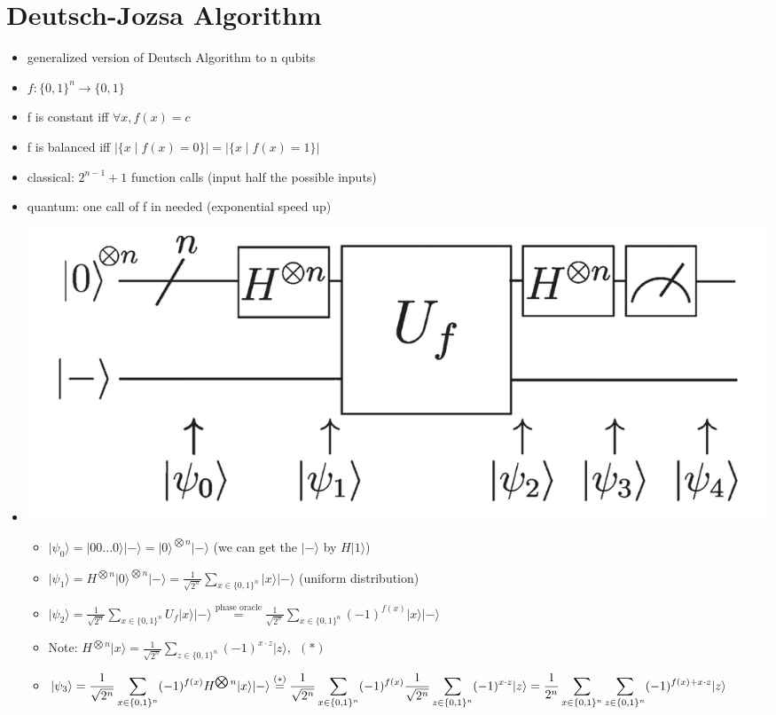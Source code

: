 \documentclass[12pt,a4paper]{article}
\newcommand{\ecb}[1]{\{#1\}}
\newcommand{\ket}[1]{\vert #1 \rangle}
\begin{document}
\section{Deutsch-Jozsa Algorithm}
\begin{itemize}
\item generalized version of Deutsch Algorithm to n qubits
\item $f : \ecb{0,1}^n \rightarrow \ecb{0,1}$
\item f is constant iff $\forall x, f(x) = c$
\item f is balanced iff $|\ecb{x \mid f(x) = 0}| = |\ecb{x \mid f(x) = 1}|$
\item classical: $2^{n-1}+1$ function calls (input half the possible inputs)
\item quantum: one call of f in needed (exponential speed up)
\item \includegraphics[scale=0.3]{./resources/jozsaplan.png}
\begin{itemize}
\item $\ket{\psi_0} = \ket{00...0}\ket{-} = \ket{0}^{\bigotimes n}\ket{-}$ (we can get the $\ket{-}$ by $H\ket{1}$)
\item $\displaystyle \ket{\psi_1} = H^{\bigotimes n}\ket{0}^{\bigotimes n}\ket{-} = \frac{1}{\sqrt{2^n}} \sum_{x\in\ecb{0,1}^n} \ket{x}\ket{-}$ (uniform distribution)
\item $\displaystyle \ket{\psi_2} = \frac{1}{\sqrt{2^n}} \sum_{x\in\ecb{0,1}^n}U_f\ket{x}\ket{-} \overset{\text{phase oracle}}{=} \frac{1}{\sqrt{2^n}} \sum_{x\in\ecb{0,1}^n} (-1)^{f(x)}\ket{x}\ket{-}$
\item Note: $\displaystyle H^{\bigotimes n}\ket{x} = \frac{1}{\sqrt{2^n}} \sum_{z\in\ecb{0,1}^n} (-1)^{x\cdot z} \ket{z}$, $\; (\ast)$
\item $\displaystyle \ket{\psi_3} = \frac{1}{\sqrt{2^n}} \sum_{x\in\ecb{0,1}^n} (-1)^{f(x)}H^{\bigotimes n}\ket{x}\ket{-}\\\overset{(\ast)}{=}
\frac{1}{\sqrt{2^n}} \sum_{x\in\ecb{0,1}^n} (-1)^{f(x)}\frac{1}{\sqrt{2^n}} \sum_{z\in\ecb{0,1}^n} (-1)^{x\cdot z} \ket{z}\\= \frac{1}{2^n}\sum_{x\in\ecb{0,1}^n}\sum_{z\in\ecb{0,1}^n} (-1)^{f(x)+x\cdot z} \ket{z}$

\end{itemize}
\end{itemize}
\end{document}
